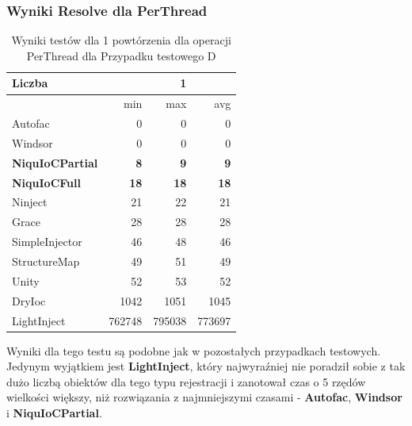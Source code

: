 \documentclass[12pt]{article}
\begin{document}
\subsubsection{Wyniki Resolve dla PerThread}
\begin{table}[H]
\captionsetup{belowskip=0pt,aboveskip=0pt}
\begin{center}
\begin{small}
	\begin{tabular}{ | l | r r r | }
    		\hline
Liczba & & 1 & \\ \hline
 & min & max & avg \\ \hline
Autofac & 0 & 0 & 0 \\ \hline
Windsor & 0 & 0 & 0 \\ \hline
\textbf{NiquIoCPartial} & \textbf{8} & \textbf{9} & \textbf{9} \\ \hline
\textbf{NiquIoCFull} & \textbf{18} & \textbf{18} & \textbf{18} \\ \hline
Ninject & 21 & 22 & 21 \\ \hline
Grace & 28 & 28 & 28 \\ \hline
SimpleInjector & 46 & 48 & 46 \\ \hline
StructureMap & 49 & 51 & 49 \\ \hline
Unity & 52 & 53 & 52 \\ \hline
DryIoc & 1042 & 1051 & 1045 \\ \hline
LightInject & 762748 & 795038 & 773697 \\ \hline
  	\end{tabular}
\end{small}
\end{center}
\caption{Wyniki testów dla 1 powtórzenia dla operacji PerThread dla Przypadku testowego D}
\label{TestCaseD_PerThread1}
\end{table}
Wyniki dla tego testu są podobne jak w pozostałych przypadkach testowych. Jedynym wyjątkiem jest \textbf{LightInject}, który najwyraźniej nie poradził sobie z tak dużo liczbą obiektów dla tego typu rejestracji i zanotował czas o 5 rzędów wielkości większy, niż rozwiązania z najmniejszymi czasami - \textbf{Autofac}, \textbf{Windsor} i \textbf{NiquIoCPartial}.
\\ \\
\end{document}
